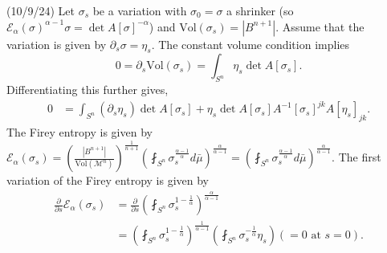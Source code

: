 \documentclass[12pt,a4paper]{article}
\begin{document}
(10/9/24) Let $ \sigma_{s} $ be a variation with $ \sigma_{0} = \sigma $ a shrinker (so $ \mathcal{E}_{\alpha}(\sigma)^{\alpha-1}\sigma = \det A[\sigma]^{-\alpha}$) and $ \text{Vol}(\sigma_{s}) = |B^{n+1}| $. Assume that the variation is given by $ \partial_{s} \sigma = \eta_{s} $. The constant volume condition implies 
\[ 0 = \partial_{s}\text{Vol}(\sigma_{s}) = \int_{S^{n}} \eta_{s} \det A[\sigma_{s}].\]
Differentiating this further gives, \begin{align*}
   0 & = \int_{S^{n}}(\partial_{s}\eta_{s}) \det A[\sigma_{s}] + \eta_{s}\det A[\sigma_{s}]A^{-1}[\sigma_{s}]^{jk}A[\eta_{s}]_{jk}.
\end{align*}
The Firey entropy is given by $ \mathcal{E}_{\alpha}(\sigma_{s}) =  \left( \frac{|B^{n+1}|}{\text{Vol}(\mathcal{M}^{n})} \right)^{ \frac{1}{n+1}} \left( \fint_{S^{n}}\sigma_{s}^{ \frac{\alpha-1}{\alpha}} d \bar{\mu}\right)^{\frac{\alpha}{\alpha-1}} = \left( \fint_{S^{n}}\sigma_{s}^{ \frac{\alpha-1}{\alpha}} d \bar{\mu}\right)^{\frac{\alpha}{\alpha-1}}$.
The first variation of the Firey entropy is given by \begin{align*}
   \frac{\partial}{\partial s}\mathcal{E}_{\alpha}(\sigma_{s}) & = \frac{\partial}{\partial s} \left( \fint_{S^{n}}\sigma_{s}^{1- \frac{1}{\alpha}} \right)^{ \frac{\alpha}{\alpha-1}} \\
   & = \left( \fint_{S^{n}}\sigma_{s}^{1- \frac{1}{\alpha}} \right)^{\frac{1}{\alpha-1}} \left( \fint_{S^{n}}\sigma_{s}^{-\frac{1}{\alpha}}\eta_{s} \right) (= 0 \text{ at } s=0).
\end{align*}
\end{document}
